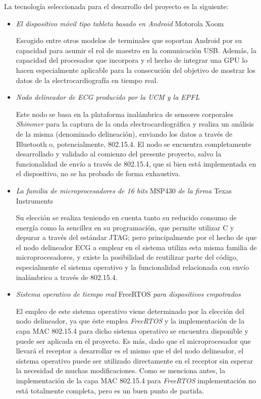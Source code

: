 	La tecnología seleccionada para el desarrollo del proyecto es la siguiente:
		\begin{itemize}
			\item \emph{El dispositivo móvil tipo tableta basado en Android} Motorola Xoom
			
			Escogido entre otros modelos de terminales que soportan Android por su capacidad para asumir el rol de maestro en la comunicación USB. Además, la capacidad del procesador que incorpora y el hecho de integrar una GPU lo hacen especialmente aplicable para la consecución del objetivo de mostrar los datos de la electrocardiografía en tiempo real.
		
			\item \emph{Nodo delineador de ECG producido por la UCM y la EPFL}

			Este nodo se basa en la plataforma inalámbrica de sensores corporales \emph{Shimmer} para la captura de la onda electrocardiográfica y realiza un análisis de la misma (denominado delineación), enviando los datos a través de Bluetooth o, potencialmente, 802.15.4. El nodo se encuentra completamente desarrollado y validado al comienzo del presente proyecto, salvo la funcionalidad de envío a través de 802.15.4, que si bien está implementada en el dispositivo, no se ha probado de forma exhaustiva.

			\item \emph{La familia de microprocesadores de 16 bits} MSP430 \emph{de la firma} Texas Instruments

			Su elección se realiza teniendo en cuenta tanto su reducido consumo de energía como la sencillez en su programación, que permite utilizar C y depurar a través del estándar JTAG; pero principalmente por el hecho de que el nodo delineador ECG a emplear en el sistema utiliza esta misma familia de microprocesadores, y existe la posibilidad de reutilizar parte del código, especialmente el sistema operativo y la funcionalidad relacionada con envío inalámbrico a través de 802.15.4.\\

			\item \emph{Sistema operativo de tiempo real} FreeRTOS \emph{para dispositivos empotrados}

			El empleo de este sistema operativo viene determinado por la elección del nodo delineador, ya que éste emplea \emph{FreeRTOS} y la implementación de la capa MAC 802.15.4 para dicho sistema operativo se encuentra disponible y puede ser aplicada en el proyecto. Es más, dado que el microprocesador que llevará el receptor a desarrollar es el mismo que el del nodo delineador, el sistema operativo puede ser utilizado directamente en el receptor sin esperar la necesidad de muchas modificaciones. Como se menciona antes, la implementación de la capa MAC 802.15.4 para \emph{FreeRTOS} implementación no está totalmente completa, pero es un buen punto de partida.

		\end{itemize}

